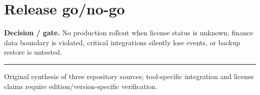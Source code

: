 \documentclass[10pt,letterpaper]{article}
\begin{document}
\section{Release go/no-go}
\textbf{Decision / gate.} No production rollout when license status is unknown, finance data boundary is violated, critical integrations silently lose events, or backup restore is untested.\par
\vfill\noindent\color{muted}\rule{\linewidth}{0.4pt}\par\scriptsize Original synthesis of three repository sources; tool-specific integration and license claims require edition/version-specific verification.\normalsize
\end{document}
